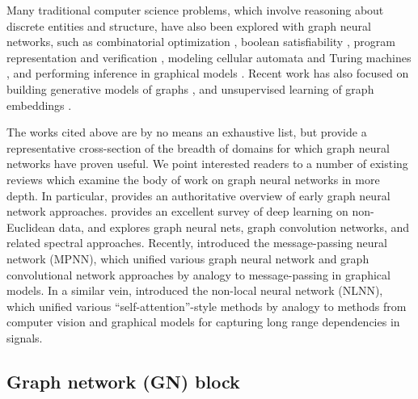 Many traditional computer science problems, which involve reasoning about discrete entities and structure, have also been explored with graph neural networks, such as
combinatorial optimization \citep{bello2016neural,nowak2017note,dai2017learning}, boolean satisfiability \citep{selsam2018learning}, program representation and verification \citep{allamanis2017learning,li2015gated}, modeling cellular automata and Turing machines \citep{johnson2017learning}, and performing inference in graphical models \citep{yoon2018inference}.
Recent work has also focused on building generative models of graphs \citep{li2018deep,decao2018molgan,you2018graphrnn,bojchevski2018netgan}, and unsupervised learning of graph embeddings \citep{perozzi2014deepwalk,tang2015line,grover2016node2vec,garcia2017learning}.

The works cited above are by no means an exhaustive list, but provide a representative cross-section of the breadth of domains for which graph neural networks have proven useful. We point interested readers to a number of existing reviews which examine the body of work on graph neural networks in more depth. In particular, \cite{scarselli2009computational} provides an authoritative overview of early graph neural network approaches.
\cite{bronstein2017geometric} provides an excellent survey of deep learning on non-Euclidean data, and explores graph neural nets, graph convolution networks, and related spectral approaches.
Recently, \cite{gilmer2017neural} introduced the message-passing neural network (MPNN), which unified various graph neural network and graph convolutional network approaches \citep{monti2017geometric,bruna2013spectral,henaff2015deep,defferrard2016convolutional,niepert2016learning,kipf2016semi,bronstein2017geometric} by analogy to message-passing in graphical models. In a similar vein, \cite{wang2017non} introduced the non-local neural network (NLNN), which unified various ``self-attention''-style methods \citep{vaswani2017attention,hoshen2017vain,velivckovic2017graph} by analogy to methods from computer vision and graphical models for capturing long range dependencies in signals.


\subsection{Graph network (GN) block}
\label{sec:model-computational}

